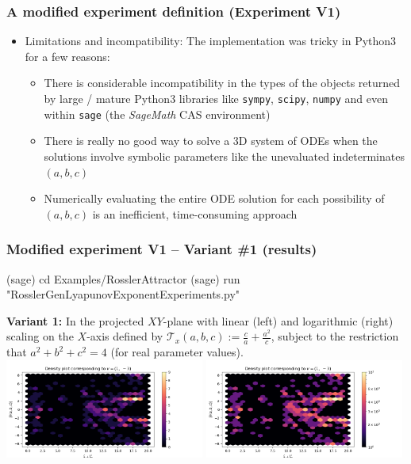 \documentclass[usenames,svgnames,dvipsnames,10pt]{beamer}
\begin{document}
\begin{frame}
\frametitle{A modified experiment definition (Experiment V1)}

\begin{itemize} 

\item Limitations and incompatibility: The implementation was tricky in Python3 for a few reasons: 
      \begin{itemize} 
      \item There is considerable incompatibility in the types of the objects returned by large / mature Python3 libraries like 
            \texttt{sympy}, \texttt{scipy}, \texttt{numpy} and even within \texttt{sage} (the \emph{SageMath} CAS environment) 
      \item There is really no good way to solve a 3D system of ODEs when the solutions involve symbolic parameters 
            like the unevaluated indeterminates $(a, b, c)$ 
      \item Numerically evaluating the entire ODE solution for each possibility of $(a, b, c)$ is an inefficient, time-consuming 
            approach
      \end{itemize}

\end{itemize} 

\end{frame}


\begin{frame}[fragile]
\frametitle{Modified experiment V1 -- Variant \#1 (results)}

\begin{center}
\begin{code}
(sage) cd Examples/RosslerAttractor
(sage) run "RosslerGenLyapunovExponentExperiments.py"
\end{code}
\textbf{Variant 1:} 
In the projected $XY$-plane with linear (left) and logarithmic (right) scaling on the $X$-axis defined by 
$\mathcal{T}_x(a, b, c) := \frac{c}{a} + \frac{a^2}{c}$, subject to the restriction that 
$a^2+b^2+c^2 = 4$ (for real parameter values). \\ 
\includegraphics[width=0.49\textwidth]{../Images/RosslerAttractorExpt1-Variant1-linearscale-TypeXY-2021-10-27-025740.png}
\includegraphics[width=0.49\textwidth]{../Images/RosslerAttractorExpt1-Variant1-logscale-TypeXY-2021-10-27-025253.png}
\end{center}

\end{frame}
\end{document}
